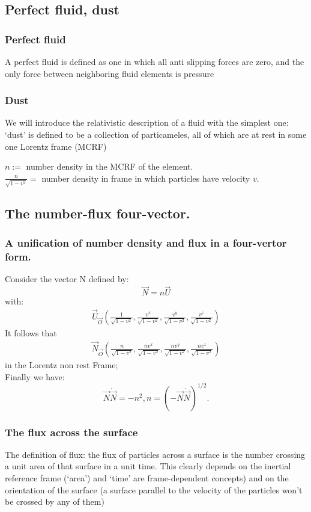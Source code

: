 \documentclass{article}
\begin{document}
\subsection{Perfect fluid, dust}
\subsubsection{Perfect fluid}
A perfect fluid is defined as one in which all anti slipping forces are zero, and the only force between neighboring fluid elements is pressure
\subsubsection{Dust}
We will introduce the relativistic description of a fluid with the simplest one: ‘dust’ is defined to be a collection of particameles, all of which are at rest in some one Lorentz frame (MCRF)

$ n := $  number density in the MCRF of the element.
\\
$\frac{n}{\sqrt{1-v^2}} = $ number density in frame in which particles have velocity $v$. 
\subsection{The number-flux four-vector.}

\subsubsection{A unification of number density and flux in a four-vertor form.}

Consider the vector N defined by:
$$ \vec{N} = n \vec{U}$$
with:
\begin{eqnarray*}
 \vec{U}_{\vec{O}} ( \frac{1}{\sqrt{1-v^2}},\frac{v^x}{\sqrt{1-v^2}},\frac{v^y}{\sqrt{1-v^2}},\frac{v^z}{\sqrt{1-v^2}} )
 \end{eqnarray*}
It follows that
\begin{eqnarray*}
 \vec{N}_{\vec{O}} ( \frac{n}{\sqrt{1-v^2}},\frac{n v^x}{\sqrt{1-v^2}},\frac{n v^y}{\sqrt{1-v^2}},\frac{n v^z}{\sqrt{1-v^2}} ) 
\end{eqnarray*}
in the Lorentz non rest Frame;\\
Finally we have:
$$ \vec{N} \dot \vec{N} = -n^2 , n = (-\vec{N} \dot \vec{N})^{1/2}. $$
\subsubsection{The flux across the surface}
The definition of flux: the flux of particles across a surface is the number crossing a unit area of that surface in a unit time. This clearly depends on the inertial reference frame (‘area’) and ‘time’ are frame-dependent concepts) and on the orientation of the surface (a surface parallel to the velocity of the particles won’t be crossed by any of them)
\end{document}
